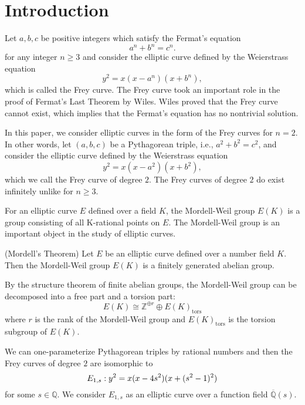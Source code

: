 \documentclass[main]{subfiles}
\begin{document}
\section{Introduction}

Let $a,b,c$ be positive integers which satisfy the Fermat's equation
\begin{equation*}
    a^{n} + b^{n} = c^{n}.
\end{equation*}
for any integer $n \geq 3$ and consider the elliptic curve defined by the Weierstrass equation
\begin{equation*}
    y^{2} = x(x - a^{n})(x + b^{n}),
\end{equation*}
which is called the Frey curve.
The Frey curve took an important role in the proof of Fermat's Last Theorem by Wiles.
Wiles proved that the Frey curve cannot exist, which implies that the Fermat's equation has no nontrivial solution.

In this paper, we consider elliptic curves in the form of the Frey curves for $n=2$.
In other words, let $(a,b,c)$ be a Pythagorean triple, i.e., $a^{2} + b^{2} = c^{2}$, and consider the elliptic curve defined by the Weierstrass equation
\begin{equation*}
    y^{2} = x(x - a^{2})(x + b^{2}),
\end{equation*}
which we call the Frey curve of degree $2$.
The Frey curves of degree $2$ do exist infinitely unlike for $n \geq 3$.

For an elliptic curve $E$ defined over a field $K$, the Mordell-Weil group $E(K)$ is a group consisting of all K-rational points on $E$.
The Mordell-Weil group is an important object in the study of elliptic curves.

\begin{thm}{(Mordell's Theorem)}
    \label{thm:mordell}
    Let $E$ be an elliptic curve defined over a number field $K$.
    Then the Mordell-Weil group $E(K)$ is a finitely generated abelian group.
\end{thm}
By the structure theorem of finite abelian groups, the Mordell-Weil group can be decomposed into a free part and a torsion part:
\begin{equation*}
    E(K) \cong \mathbb{Z}^{\oplus r} \oplus E(K)_{\text{tors}}
\end{equation*}
where $r$ is the rank of the Mordell-Weil group and $E(K)_{\text{tors}}$ is the torsion subgroup of $E(K)$.

We can one-parameterize Pythagorean triples by rational numbers and then the Frey curves of degree $2$ are isomorphic to
\begin{equation}
    \label{eq:E_{1,s}}
    E_{1,s}: y^{2} = x(x - 4s^{2})(x + (s^{2} - 1)^{2})
\end{equation}
for some $s \in \mathbb{Q}$.
We consider $E_{1,s}$ as an elliptic curve over a function field $\overline{\mathbb{Q}}(s)$.
\end{document}
